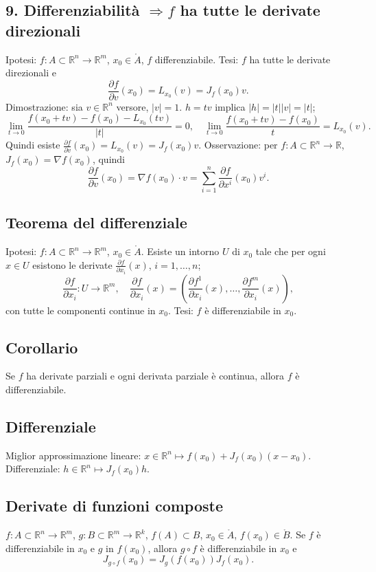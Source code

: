\documentclass[11pt,a4paper]{article}
\newcommand{\R}{\mathbb R}\newcommand{\N}{\mathbb N}\newcommand{\pagina}[1]{\clearpage}
\begin{document}
\subsection*{9. Differenziabilità $\Rightarrow f$ ha tutte le derivate direzionali}
Ipotesi: $f:A\subset\R^n\to\R^m$, $x_0\in\mathring A$, $f$ differenziabile. Tesi: $f$ ha tutte le derivate direzionali e
\[\frac{\partial f}{\partial v}(x_0)=L_{x_0}(v)=J_f(x_0)v.\]
Dimostrazione: sia $v\in\R^n$ versore, $|v|=1$. $h=tv$ implica $|h|=|t||v|=|t|$;
\[\lim_{t\to0}\frac{f(x_0+tv)-f(x_0)-L_{x_0}(tv)}{|t|}=0,
\quad\lim_{t\to0}\frac{f(x_0+tv)-f(x_0)}t=L_{x_0}(v).\]
Quindi esiste $\frac{\partial f}{\partial v}(x_0)=L_{x_0}(v)=J_f(x_0)v$.
Osservazione: per $f:A\subset\R^n\to\R$, $J_f(x_0)=\nabla f(x_0)$, quindi
\[\frac{\partial f}{\partial v}(x_0)=\nabla f(x_0)\cdot v=\sum_{i=1}^n\frac{\partial f}{\partial x^i}(x_0)v^i.\]
\subsection*{Teorema del differenziale}
Ipotesi: $f:A\subset\R^n\to\R^m$, $x_0\in\mathring A$. Esiste un intorno $U$ di $x_0$ tale che per ogni $x\in U$ esistono le derivate $\frac{\partial f}{\partial x_i}(x)$, $i=1,\ldots,n$;
\[\frac{\partial f}{\partial x_i}:U\to\R^m,
\quad\frac{\partial f}{\partial x_i}(x)=\left(\frac{\partial f^1}{\partial x_i}(x),\ldots,\frac{\partial f^m}{\partial x_i}(x)\right),\]
con tutte le componenti continue in $x_0$. Tesi: $f$ è differenziabile in $x_0$.
\pagina{24}
\subsection*{Corollario}
Se $f$ ha derivate parziali e ogni derivata parziale è continua, allora $f$ è differenziabile.
\subsection*{Differenziale}
Miglior approssimazione lineare: $x\in\R^n\mapsto f(x_0)+J_f(x_0)(x-x_0)$.
Differenziale: $h\in\R^n\mapsto J_f(x_0)h$.
\subsection*{Derivate di funzioni composte}
$f:A\subset\R^n\to\R^m$, $g:B\subset\R^m\to\R^k$, $f(A)\subset B$, $x_0\in\mathring A$, $f(x_0)\in\mathring B$. Se $f$ è differenziabile in $x_0$ e $g$ in $f(x_0)$, allora $g\circ f$ è differenziabile in $x_0$ e
\[J_{g\circ f}(x_0)=J_g(f(x_0))J_f(x_0).\]
\end{document}

